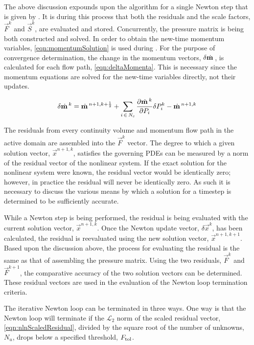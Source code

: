 The above discussion expounds upon the algorithm for a single Newton step that is given by .
It is during this process that both the residuals and the scale factors, $\vec{F}^{k}$ and $\vec{S}^{k}$, are evaluated and stored.
Concurrently, the pressure matrix is being both constructed and solved.
In order to obtain the new-time momentum variables, \eqref{eqn:momentumSolution} is used during .
For the purpose of convergence determination, the change in the momentum vectors, $\delta \momVec{}$, is calculated for each flow path, \eqref{eqn:deltaMomenta}.
This is necessary since the momentum equations are solved for the new-time variables directly, not their updates.

\begin{equation}
\label{eqn:deltaMomenta}
\delta \momVec{}^{k} = \momVec{}^{n+1,k + \onehalf} + \sum_{i \, \in \, N_{c} } \frac{\partial \momVec{}^{k}}{\partial P_{i}} \delta P^{k}_{i} - \momVec{}^{n+1, k}
\end{equation}

The residuals from every continuity volume and momentum flow path in the active domain are assembled into the $\vec{F}^{k}$ vector.
The degree to which a given solution vector, $\vec{x}^{n+1, k}$, satisfies the governing PDEs can be measured by a norm of the residual vector of the nonlinear system.
If the exact solution for the nonlinear system were known, the residual vector would be identically zero; however, in practice the residual will never be identically zero.
As such it is necessary to discuss the various means by which a solution for a timestep is determined to be sufficiently accurate.

While a Newton step is being performed, the residual is being evaluated with the current solution vector, $\vec{x}^{n+1,k}$.
Once the Newton update vector, $\delta \vec{x}^{k}$, has been calculated, the residual is reevaluated using the new solution vector, $\vec{x}^{n+1, k+1}$.
Based upon the discussion above, the process for evaluating the residual is the same as that of assembling the pressure matrix.
Using the two residuals, $\vec{F}^{k}$ and $\vec{F}^{k+1}$, the comparative accuracy of the two solution vectors can be determined.
These residual vectors are used in the evaluation of the Newton loop termination criteria.

The iterative Newton loop can be terminated in three ways.
One way is that the Newton loop will terminate if the $\mathcal{L}_{2}$ norm of the scaled residual vector, \eqref{eqn:nlnScaledResidual}, divided by the square root of the number of unknowns, $N_{u}$, drops below a specified threshold, $\ftol{}$.

